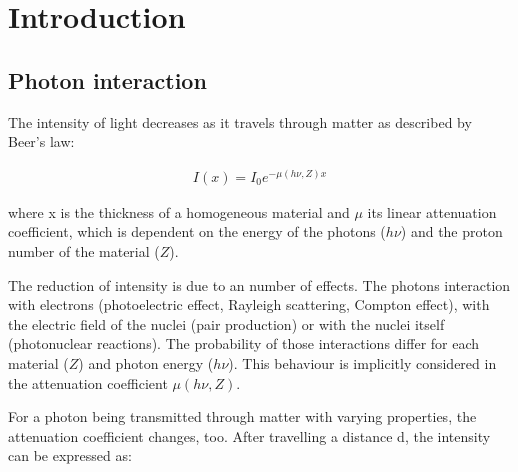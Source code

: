 \chapter{Introduction}
\label{chap:intro}

\section{Photon interaction}
\label{sec:photon}
The intensity of light decreases as it travels through matter as described by Beer's law:

\begin{align}
I(x) = I_0 e^{-\mu(h\nu,Z)x}
\end{align}

where x is the thickness of a homogeneous material and
$\mu$ its linear attenuation coefficient, which is dependent on the energy of the photons ($h\nu$) and the proton number of the material ($Z$).

The reduction of intensity is due to an number of effects. The photons interaction with electrons (photoelectric effect, Rayleigh scattering, Compton effect), with the electric field of the nuclei (pair production) or with the nuclei itself (photonuclear reactions). The probability of those interactions differ for each material ($Z$) and photon energy ($h\nu$). This behaviour is implicitly considered in the attenuation coefficient $\mu(h\nu,Z)$.

For a photon being transmitted through matter with varying properties, the attenuation coefficient changes, too. After travelling a distance d, the intensity can be expressed as:

